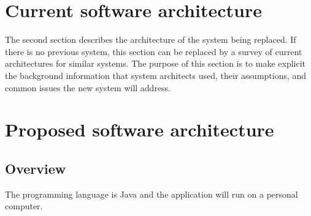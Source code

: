 \documentclass[11pt]{article}
\begin{document}


\section{Current software architecture}
The second section describes the architecture of the system being replaced. If there is no previous system, this section can be replaced by a survey of current architectures for similar systems. The purpose of this section is to make explicit the background information that system architects used, their assumptions, and common issues the new system will address.

\section{ Proposed software architecture}
\subsection{Overview}
The programming language is Java and the application will run on a personal computer.
\end{document}
